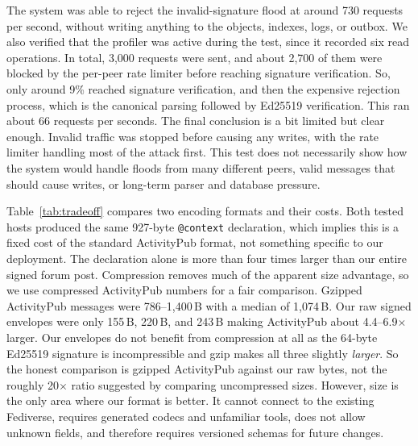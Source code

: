\documentclass[conference,a4paper]{IEEEtran}
\begin{document}
The system was able to reject the invalid-signature flood at around 730 requests per second, without writing anything to the objects, indexes, logs, or outbox. We also verified that the profiler was active during the test, since it recorded six read operations. In total, 3,000 requests were sent, and about 2,700 of them were blocked by the per-peer rate limiter before reaching signature verification. So, only around 9\% reached signature verification, and then the expensive rejection process, which is the canonical parsing followed by Ed25519 verification. This ran about 66 requests per seconds. The final conclusion is a bit limited but clear enough. Invalid traffic was stopped before causing any writes, with the rate limiter handling most of the attack first. This test does not necessarily show how the system would handle floods from many different peers, valid messages that should cause writes, or long-term parser and database pressure.


Table~\ref{tab:tradeoff} compares two encoding formats and their costs. Both
tested hosts produced the same 927-byte \texttt{@context} declaration, which implies this is a fixed cost of the standard ActivityPub format, not something specific to our deployment. The declaration alone is more than four times larger than our entire signed forum post. Compression removes much of the apparent size advantage, so we use compressed ActivityPub numbers for a fair comparison.
Gzipped ActivityPub messages were 786--1{,}400\,B with a median of 1{,}074\,B. Our raw signed
envelopes were only 155\,B, 220\,B, and 243\,B making ActivityPub about 4.4--6.9$\times$ larger. Our envelopes do not benefit from compression at
all as the 64-byte Ed25519 signature is incompressible and gzip makes all three slightly
\emph{larger}. So the honest comparison is gzipped ActivityPub against our raw bytes, not the
roughly 20$\times$ ratio suggested by comparing uncompressed sizes. However, size is the only area where our format is better. It cannot connect to the existing Fediverse, requires generated codecs and unfamiliar tools, does not allow unknown fields, and therefore requires versioned schemas for future changes.
\end{document}
